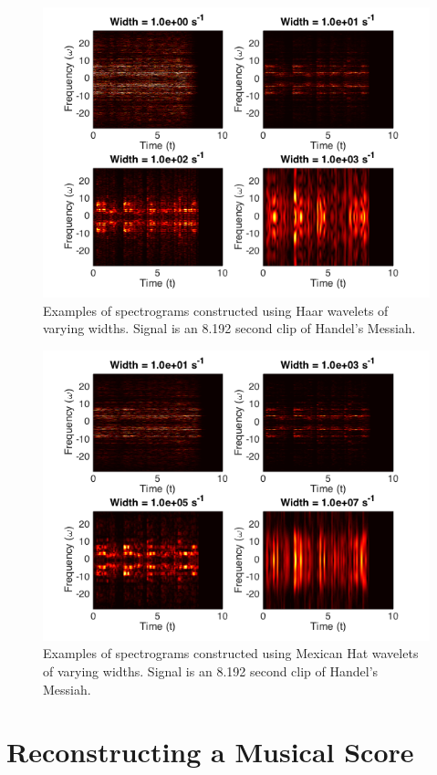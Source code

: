 \documentclass[paper=a4, fontsize=11pt]{scrartcl} %
\numberwithin{equation}{section} %
\numberwithin{figure}{section} %
\numberwithin{table}{section} %
\begin{document}
\begin{figure}
	\centering
	\includegraphics[scale = 0.8]{spectrogram_haar.png}
	\caption{Examples of spectrograms constructed using Haar wavelets of varying widths. Signal is an 8.192 second clip of Handel's Messiah.}
\end{figure}
\begin{figure}
	\centering
	\includegraphics[scale = 0.8]{spectrogram_hat.png}
	\caption{Examples of spectrograms constructed using Mexican Hat wavelets of varying widths. Signal is an 8.192 second clip of Handel's Messiah.}
\end{figure}




\section{Reconstructing a Musical Score}





\end{document}

